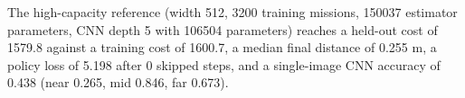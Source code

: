 The high-capacity reference (width 512, 3200 training missions, 150037 estimator parameters, CNN depth 5 with 106504 parameters) reaches a held-out cost of 1579.8 against a training cost of 1600.7, a median final distance of 0.255 m, a policy loss of 5.198 after 0 skipped steps, and a single-image CNN accuracy of 0.438 (near 0.265, mid 0.846, far 0.673).%